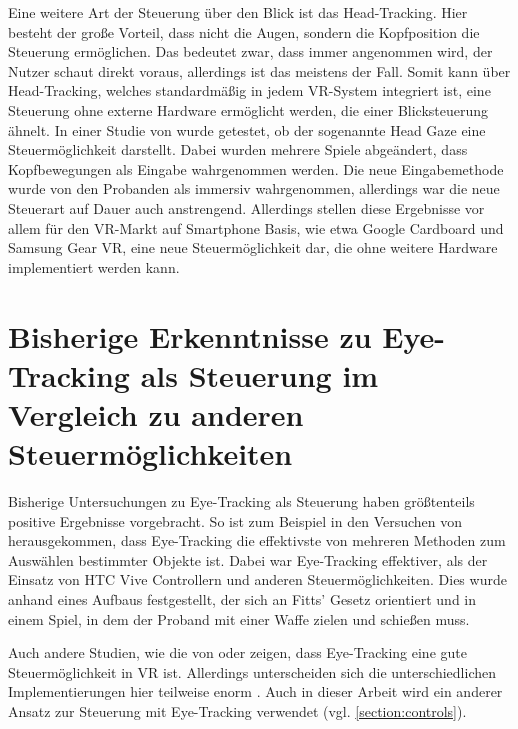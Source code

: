 Eine weitere Art der Steuerung über den Blick ist das Head-Tracking. Hier besteht der große Vorteil, dass nicht die Augen, sondern die Kopfposition die Steuerung ermöglichen. Das bedeutet zwar, dass immer angenommen wird, der Nutzer schaut direkt voraus, allerdings ist das meistens der Fall. Somit kann über Head-Tracking, welches standardmäßig in jedem VR-System integriert ist, eine Steuerung ohne externe Hardware ermöglicht werden, die einer Blicksteuerung ähnelt. In einer Studie von \citeauthor{R.Atienza.2016} wurde getestet, ob der sogenannte \glqq Head Gaze\grqq{} eine Steuermöglichkeit darstellt. Dabei wurden mehrere Spiele abgeändert, dass Kopfbewegungen als Eingabe wahrgenommen werden. Die neue Eingabemethode wurde von den Probanden als immersiv wahrgenommen, allerdings war die neue Steuerart auf Dauer auch anstrengend. Allerdings stellen diese Ergebnisse vor allem für den VR-Markt auf Smartphone Basis, wie etwa Google Cardboard und Samsung Gear VR, eine neue Steuermöglichkeit dar, die ohne weitere Hardware implementiert werden kann. \cite{R.Atienza.2016}

\section{Bisherige Erkenntnisse zu Eye-Tracking als Steuerung im Vergleich zu anderen Steuermöglichkeiten}
Bisherige Untersuchungen zu Eye-Tracking als Steuerung haben größtenteils positive Ergebnisse vorgebracht. So ist zum Beispiel in den Versuchen von \citeauthor{Pai.2019} herausgekommen, dass Eye-Tracking die effektivste von mehreren Methoden zum Auswählen bestimmter Objekte ist. Dabei war Eye-Tracking effektiver, als der Einsatz von HTC Vive Controllern und anderen Steuermöglichkeiten. Dies wurde anhand eines Aufbaus festgestellt, der sich an Fitts' Gesetz orientiert und in einem Spiel, in dem der Proband mit einer Waffe zielen und schießen muss. \cite{Pai.2019}

Auch andere Studien, wie die von \citeauthor{D.Kumar.2016} oder \citeauthor{R.Atienza.2016} zeigen, dass Eye-Tracking eine gute Steuermöglichkeit in VR ist. Allerdings unterscheiden sich die unterschiedlichen Implementierungen hier teilweise enorm \cite{Pai.2019} \cite{R.Atienza.2016} \cite{D.Kumar.2016}. Auch in dieser Arbeit wird ein anderer Ansatz zur Steuerung mit Eye-Tracking verwendet (vgl. \autoref{section:controls}).

